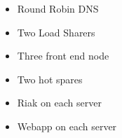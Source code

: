 \documentclass[landscape,a0paper,final,showframe]{baposter}
\begin{document}
\begin{poster}
{\begin{multicols}{3}
\begin{itemize}
\item Round Robin DNS \\
\item Two Load Sharers 
\item Three front end node  \\
\item Two hot spares 
\item Riak on each server \\
\item Webapp on each server
\end{itemize}

\end{multicols}

  }

\end{poster}
\end{document}
